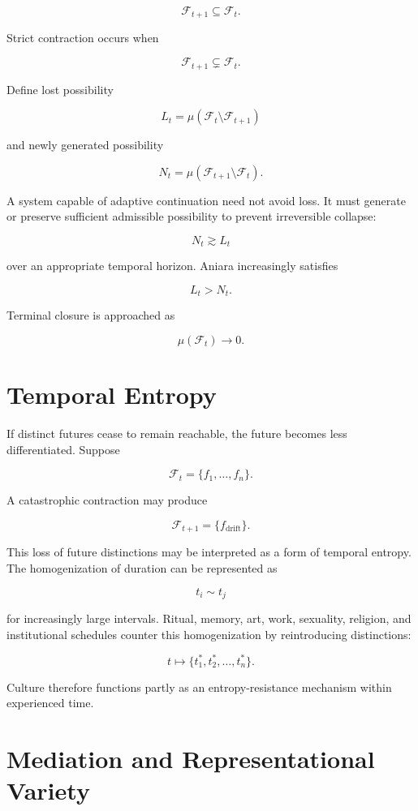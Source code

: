 \documentclass[11pt,oneside]{book}
\theoremstyle{definition}
\theoremstyle{remark}
\begin{document}
\[
\mathcal{F}_{t+1} \subseteq \mathcal{F}_t.
\]

Strict contraction occurs when

\[
\mathcal{F}_{t+1} \subsetneq \mathcal{F}_t.
\]

Define lost possibility

\[
L_t = \mu( \mathcal{F}_t \setminus \mathcal{F}_{t+1} )
\]

and newly generated possibility

\[
N_t = \mu( \mathcal{F}_{t+1} \setminus \mathcal{F}_t ).
\]

A system capable of adaptive continuation need not avoid loss. It must generate or preserve
sufficient admissible possibility to prevent irreversible collapse:

\[
N_t \gtrsim L_t
\]

over an appropriate temporal horizon. Aniara increasingly satisfies

\[
L_t>N_t.
\]

Terminal closure is approached as

\[
\mu(\mathcal{F}_t)\rightarrow0.
\]

\section{Temporal Entropy}

If distinct futures cease to remain reachable, the future becomes less differentiated. Suppose

\[
\mathcal{F}_t = \{f_1,\ldots,f_n\}.
\]

A catastrophic contraction may produce

\[
\mathcal{F}_{t+1} = \{f_{\mathrm{drift}}\}.
\]

This loss of future distinctions may be interpreted as a form of temporal entropy. The
homogenization of duration can be represented as

\[
t_i\sim t_j
\]

for increasingly large intervals. Ritual, memory, art, work, sexuality, religion, and institutional
schedules counter this homogenization by reintroducing distinctions:

\[
t \mapsto \{ t_1^{*}, t_2^{*}, \ldots, t_n^{*} \}.
\]

Culture therefore functions partly as an entropy-resistance mechanism within experienced time.

\section{Mediation and Representational Variety}
\end{document}
